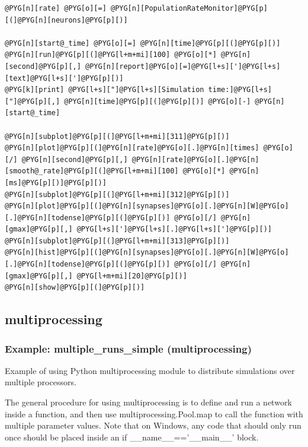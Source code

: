 \documentclass[letterpaper,10pt,english]{manual}
\begin{document}
\begin{Verbatim}[commandchars=@\[\]]
@PYG[n][rate] @PYG[o][=] @PYG[n][PopulationRateMonitor]@PYG[p][(]@PYG[n][neurons]@PYG[p][)]

@PYG[n][start@_time] @PYG[o][=] @PYG[n][time]@PYG[p][(]@PYG[p][)]
@PYG[n][run]@PYG[p][(]@PYG[l+m+mi][100] @PYG[o][*] @PYG[n][second]@PYG[p][,] @PYG[n][report]@PYG[o][=]@PYG[l+s][']@PYG[l+s][text]@PYG[l+s][']@PYG[p][)]
@PYG[k][print] @PYG[l+s]["]@PYG[l+s][Simulation time:]@PYG[l+s]["]@PYG[p][,] @PYG[n][time]@PYG[p][(]@PYG[p][)] @PYG[o][-] @PYG[n][start@_time]

@PYG[n][subplot]@PYG[p][(]@PYG[l+m+mi][311]@PYG[p][)]
@PYG[n][plot]@PYG[p][(]@PYG[n][rate]@PYG[o][.]@PYG[n][times] @PYG[o][/] @PYG[n][second]@PYG[p][,] @PYG[n][rate]@PYG[o][.]@PYG[n][smooth@_rate]@PYG[p][(]@PYG[l+m+mi][100] @PYG[o][*] @PYG[n][ms]@PYG[p][)]@PYG[p][)]
@PYG[n][subplot]@PYG[p][(]@PYG[l+m+mi][312]@PYG[p][)]
@PYG[n][plot]@PYG[p][(]@PYG[n][synapses]@PYG[o][.]@PYG[n][W]@PYG[o][.]@PYG[n][todense]@PYG[p][(]@PYG[p][)] @PYG[o][/] @PYG[n][gmax]@PYG[p][,] @PYG[l+s][']@PYG[l+s][.]@PYG[l+s][']@PYG[p][)]
@PYG[n][subplot]@PYG[p][(]@PYG[l+m+mi][313]@PYG[p][)]
@PYG[n][hist]@PYG[p][(]@PYG[n][synapses]@PYG[o][.]@PYG[n][W]@PYG[o][.]@PYG[n][todense]@PYG[p][(]@PYG[p][)] @PYG[o][/] @PYG[n][gmax]@PYG[p][,] @PYG[l+m+mi][20]@PYG[p][)]
@PYG[n][show]@PYG[p][(]@PYG[p][)]
\end{Verbatim}


\subsection{multiprocessing}

\resetcurrentobjects
\hypertarget{--doc-examples-multiprocessing_multiple_runs_simple}{}

\hypertarget{example-multiprocessing-multiple-runs-simple}{}\subsubsection{Example: multiple\_runs\_simple (multiprocessing)}

Example of using Python multiprocessing module to distribute simulations over
multiple processors.

The general procedure for using multiprocessing is to define and run a network
inside a function, and then use multiprocessing.Pool.map to call the function
with multiple parameter values. Note that on Windows, any code that should only
run once should be placed inside an if \_\_name\_\_=='\_\_main\_\_' block.
\end{document}
